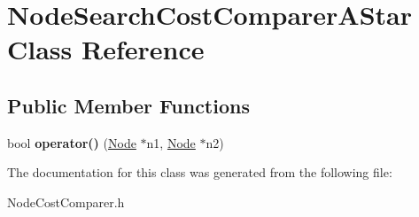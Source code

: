 \hypertarget{class_node_search_cost_comparer_a_star}{}\section{Node\+Search\+Cost\+Comparer\+A\+Star Class Reference}
\label{class_node_search_cost_comparer_a_star}
\subsection*{Public Member Functions}
\begin{DoxyCompactItemize}
\item 
\mbox{\label{class_node_search_cost_comparer_a_star_ab5af655583d46113ef1d2beae9e4dc7c}} 
bool {\bfseries operator()} (\mbox{\hyperlink{class_node}{Node}} $\ast$n1, \mbox{\hyperlink{class_node}{Node}} $\ast$n2)
\end{DoxyCompactItemize}


The documentation for this class was generated from the following file\+:\begin{DoxyCompactItemize}
\item 
Node\+Cost\+Comparer.\+h\end{DoxyCompactItemize}
